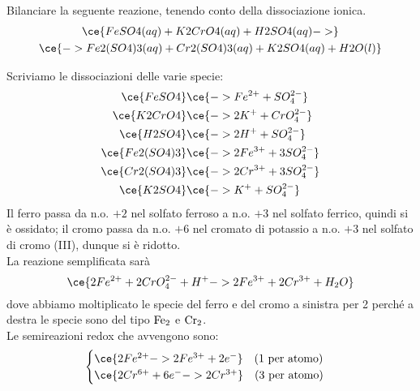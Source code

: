 \newpage

\begin{esercizio}
    Bilanciare la seguente reazione, tenendo conto della dissociazione ionica.
    \begin{gather*}
        \ce{FeSO4(aq) + K2CrO4(aq) + H2SO4(aq) ->}
        \\
        \ce{-> Fe2(SO4)3(aq) + Cr2(SO4)3(aq) + K2SO4(aq) + H2O(l)}
    \end{gather*}
\end{esercizio}
\begin{soluzione}
    Scriviamo le dissociazioni delle varie specie:
    \begin{equation*}
        \begin{split}
            \ce{FeSO4} & \ce{-> Fe^{2+} + SO_4^{2-}}
            \\
            \ce{K2CrO4} & \ce{-> 2K^+ + CrO_4^{2-}}
            \\
            \ce{H2SO4} & \ce{-> 2H^+ + SO_4^{2-}}
            \\
            \ce{Fe2(SO4)3} & \ce{-> 2Fe^{3+} + 3SO_4^{2-}}
            \\
            \ce{Cr2(SO4)3} & \ce{-> 2Cr^{3+} + 3SO_4^{2-}}
            \\
            \ce{K2SO4} & \ce{-> K^+ + SO_4^{2-}}
            \\
        \end{split}
    \end{equation*}
    Il ferro passa da n.o. $+2$ nel solfato ferroso a n.o. $+3$ nel solfato ferrico, quindi si è ossidato; il cromo passa da n.o. $+6$ nel cromato di potassio a n.o. $+3$ nel solfato di cromo (III), dunque si è ridotto.\\
    La reazione semplificata sarà
    \begin{equation*}
        \ce{2Fe^{2+} + 2CrO_4^{2-} + H^+ -> 2Fe^{3+} + 2Cr^{3+} + H_2O}
    \end{equation*}
    dove abbiamo moltiplicato le specie del ferro e del cromo a sinistra per 2 perché a destra le specie sono del tipo $\rm Fe_2$ e $\rm Cr_2$.\\
    Le semireazioni redox che avvengono sono:
    \begin{equation*}
        \begin{cases}
            \ce{2Fe^{2+} -> 2Fe^{3+} + 2e^-} \quad (\text{1 per atomo})\\
            \ce{2Cr^{6+} + 6e^- -> 2Cr^{3+}} \quad (\text{3 per atomo})
        \end{cases}

\end{equation*}
\end{soluzione}
